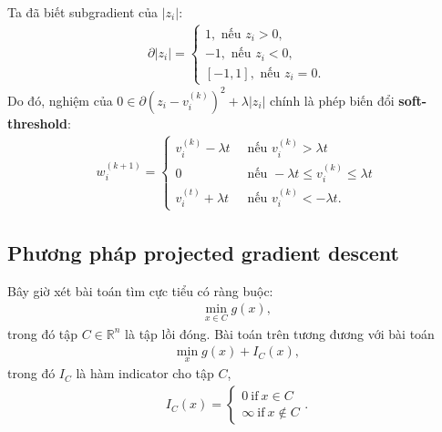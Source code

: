 \documentclass{book}
\begin{document}
Ta đã biết subgradient của $|z_i|$:
\begin{align*}
\partial |z_i| = \begin{cases} 1, \textrm{ nếu } z_i > 0,\\
							-1, \textrm{ nếu } z_i < 0,\\ 
							[-1,1], \textrm{ nếu } z_i = 0.\end{cases}
\end{align*}
Do đó, nghiệm của $0 \in \partial (z_i - v_i^{(k)})^2 + \lambda |z_i|$ chính là phép biến đổi \textbf{soft-threshold}:
\begin{align*}
w^{(k+1)}_i = \begin{cases} v_i^{(k)} - \lambda t ~ & \textrm{ nếu } v_i^{(k)} > \lambda t \\ 
0 & \textrm{ nếu } -\lambda t \leq v_i^{(k)} \leq \lambda t\\
v_i^{(t)} + \lambda t ~ & \textrm{ nếu } v_i^{(k)} < -\lambda t. \end{cases}
\end{align*}

%


\subsection{Phương pháp projected gradient descent}
Bây giờ xét bài toán tìm cực tiểu có ràng buộc:
\begin{align*}
\min_{x \in C} g(x),
\label{eq:constraint_prob}
\end{align*}
trong đó tập $C \in \mathbb{R}^n$ là tập lồi đóng.
Bài toán trên tương đương với bài toán
\begin{align}
\min_x g(x) + I_C (x),
\end{align}
trong đó $I_C$ là hàm indicator cho tập $C$,
\begin{align*}
I_C (x) = \begin{cases} 0 ~\mathrm{if}~ x \in C \\ \infty ~\mathrm{if}~ x \notin C \end{cases}.
\end{align*}
\end{document}
